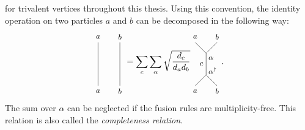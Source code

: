 for trivalent vertices throughout this thesis. Using this convention, the identity operation on two particles $a$ and $b$ can be decomposed in the following way:
	\begin{equation}
	\label{eq:identity}
		\begin{tikzpicture}[scale=0.9,baseline=(current bounding box.center)]
			\node at (0,0) {\small $a$};
			\node at (1,0) {\small $b$};
			\node at (0,2.5) {\small $a$};
			\node at (1,2.5) {\small $b$};
			\draw (0,0.25) -- (0,2.25);
			\draw (1,0.25) -- (1,2.25);
		\end{tikzpicture}=\sum_c\sum_\alpha \sqrt{\frac{d_c}{d_a d_b}}
		\begin{tikzpicture}[scale=0.9,baseline=(current bounding box.center)]
			\node at (0,0) {\small $a$};
			\node at (1,0) {\small $b$};
			\node at (0,2.5) {\small $a$};
			\node at (1,2.5) {\small $b$};
			\draw (0,0.25) -- (0.5,0.75) to node[left] {\small $c$} (0.5,1.75) -- (0,2.25);
			\draw (1,0.25) -- (0.5,0.75);
			\draw (1,2.25) -- (0.5,1.75);
			\node at (0.8,0.95) {\small $\alpha^\dagger$};
			\node at (0.8,1.6) {\small $\alpha\phantom{^\dagger}$};
		\end{tikzpicture}.
	\end{equation}
The sum over $\alpha$ can be neglected if the fusion rules are multiplicity-free. This relation is also called the \emph{completeness relation}.

